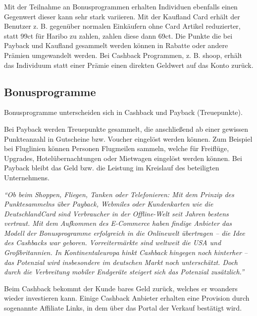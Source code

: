 \noindent Mit der Teilnahme an Bonusprogrammen erhalten Individuen ebenfalls einen Gegenwert dieser kann sehr stark variieren. Mit der Kaufland Card erhält der Benutzer z. B. gegenüber normalen Einkäufern ohne Card Artikel reduzierter, statt 99ct für Haribo zu zahlen, zahlen diese dann 69ct. Die Punkte die bei Payback und Kaufland gesammelt werden können in Rabatte oder andere Prämien umgewandelt werden. Bei Cashback Programmen, z. B. shoop, erhält das Individuum statt einer Prämie einen direkten Geldwert auf das Konto zurück. 

\subsection{Bonusprogramme}

Bonusprogramme unterscheiden sich in Cashback und Payback (Treuepunkte). \newline

\noindent Bei Payback werden Treuepunkte gesammelt, die anschließend ab einer gewissen Punkteanzahl in Gutscheine bzw. Voucher eingelöst werden können. Zum Beispiel bei Fluglinien können Personen Flugmeilen sammeln, welche für Freiflüge, Upgrades, Hotelübernachtungen oder Mietwagen eingelöst werden können. Bei Payback bleibt das Geld bzw. die Leistung im Kreislauf des beteiligten Unternehmens. \cite{paycashback_all} \newline

\noindent \textit{``Ob beim Shoppen, Fliegen, Tanken oder Telefonieren: Mit dem Prinzip des Punktesammelns über Payback, Webmiles oder Kundenkarten wie die DeutschlandCard sind Verbraucher in der Offline-Welt seit Jahren bestens vertraut. Mit dem Aufkommen des E-Commerce haben findige Anbieter das Modell der Bonusprogramme erfolgreich in die Onlinewelt übertragen – die Idee des Cashbacks war geboren. Vorreitermärkte sind weltweit die USA und Großbritannien. In Kontinentaleuropa hinkt Cashback hingegen noch hinterher – das Potenzial wird insbesondere im deutschen Markt noch unterschätzt. Doch durch die Verbreitung mobiler Endgeräte steigert sich das Potenzial zusätzlich.'' \cite{Bonus_affiliate}} \newline

\noindent Beim Cashback bekommt der Kunde bares Geld zurück, welches er woanders wieder investieren kann. Einige Cashback Anbieter erhalten eine Provision durch sogenannte Affiliate Links, in dem über das Portal der Verkauf bestätigt wird. \cite{cashback-vergleich} \newline

